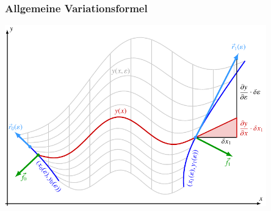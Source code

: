%
%
%
\bgroup
\begin{frame}[t]
\setlength{\abovedisplayskip}{5pt}
\setlength{\belowdisplayskip}{5pt}
\frametitle{Allgemeine Variationsformel}
\vspace{-11pt}
\begin{center}
\includegraphics[width=0.85\textwidth]{../../buch/chapters/020-variation/images/variation.pdf}
\end{center}
\end{frame}
\egroup
